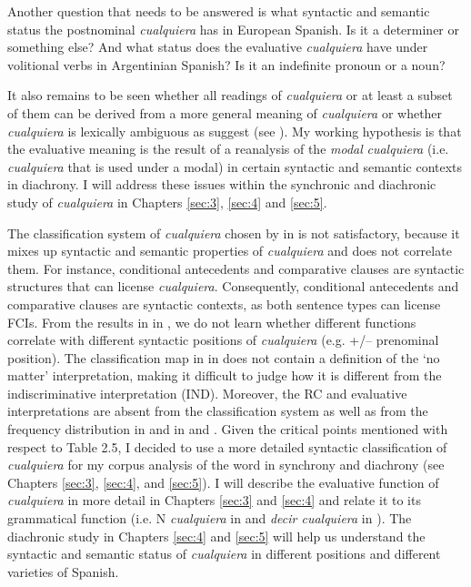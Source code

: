 Another question that needs to be answered is what syntactic and semantic status the postnominal \textit{cualquiera} has in European Spanish. Is it a determiner or something else? And what status does the evaluative \textit{cualquiera} have under volitional verbs in Argentinian Spanish? Is it an indefinite pronoun or a noun?

It also remains to be seen whether all readings of \textit{cualquiera} or at least a subset of them can be derived from a more general meaning of \textit{cualquiera} or whether \textit{cualquiera} is lexically ambiguous as \citet{am2018} suggest (see ). My working hypothesis is that the evaluative meaning is the result of a reanalysis of the {\textit{modal}} \textit{cualquiera} (i.e. \textit{cualquiera} that is used under a modal) in certain syntactic and semantic contexts in diachrony. I will address these issues within the synchronic and diachronic study of \textit{cualquiera} in Chapters \ref{sec:3}, \ref{sec:4} and \ref{sec:5}.

The classification system of \textit{cualquiera} chosen by \citet{AloniEtAl2010} in  is not satisfactory, because it mixes up syntactic and semantic properties of \textit{cualquiera} and does not correlate them. For instance, conditional antecedents and comparative clauses are syntactic structures that can license \textit{cualquiera}. Consequently, conditional antecedents and comparative clauses are syntactic contexts, as both sentence types can license FCIs. From the results in  in , we do not learn whether different functions correlate with different syntactic positions of \textit{cualquiera} (e.g. +/– prenominal position). The classification map in  in  does not contain a definition of the ‘no matter’ interpretation, making it difficult to judge how it is different from the indiscriminative interpretation (IND). Moreover, the RC and evaluative interpretations are absent from the classification system as well as from the frequency distribution in  and  in  and . Given the critical points mentioned with respect to Table 2.5, I decided to use a more detailed syntactic classification of \textit{cualquiera} for my corpus analysis of the word in synchrony and diachrony (see Chapters \ref{sec:3}, \ref{sec:4}, and \ref{sec:5}). I will describe the evaluative function of \textit{cualquiera} in more detail in Chapters \ref{sec:3} and \ref{sec:4} and relate it to its grammatical function (i.e. N \textit{cualquiera} in  and \textit{decir cualquiera} in ). The diachronic study in Chapters \ref{sec:4} and \ref{sec:5} will help us understand the syntactic and semantic status of \textit{cualquiera} in different positions and different varieties of Spanish.

